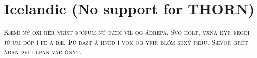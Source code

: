 

\presection\section*{\checkmeh Icelandic (No support for THORN)}\postsection

\textsc{Kæmi ný öxi hér ykist þjófum nú bæði víl og ádrepa.
Svo hölt, yxna kýr þegði jú um dóp í fé á bæ. 
Þú dazt á hnéð í vök og yfir blóm sexý pæju.
Sævör grét áðan því úlpan var ónýt.}